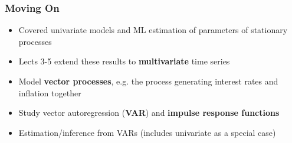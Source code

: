 \documentclass{beamer}
\begin{document}
		\begin{frame}
		\frametitle{Moving On}
		\begin{itemize}
			\item[] Covered univariate models and ML estimation of parameters of stationary processes
						\pause\vspace{15pt}
			\item[] Lects 3-5  extend these results to \textbf{multivariate} time series
						\pause\vspace{15pt}
			\item[] Model \textbf{vector processes}, e.g. the process generating interest rates and inflation together
						\pause\vspace{15pt}
			\item[] Study vector autoregression (\textbf{VAR}) and \textbf{impulse response functions}
						\pause\vspace{15pt}
			\item[] Estimation/inference from VARs (includes univariate as a special case)
			
			
			
				\end{itemize}
	\end{frame}
	
			
\end{document}
